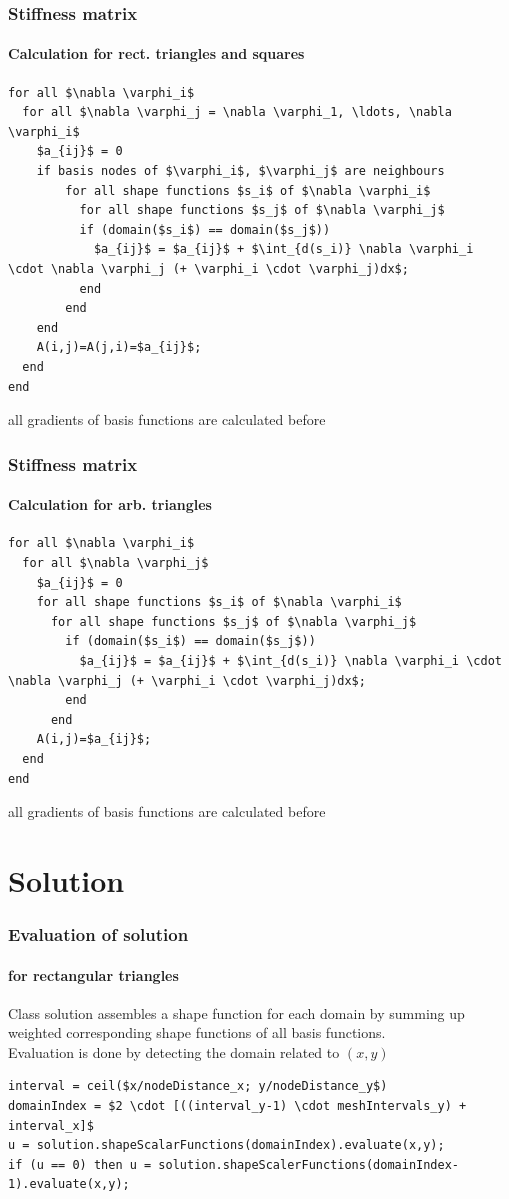 \documentclass[mathserif]{beamer}
\begin{document}
\begin{frame}[fragile]
\frametitle{Stiffness matrix}
\framesubtitle{Calculation for rect. triangles and squares}
\begin{lstlisting}[basicstyle=\tiny, mathescape]
for all $\nabla \varphi_i$
  for all $\nabla \varphi_j = \nabla \varphi_1, \ldots, \nabla \varphi_i$
    $a_{ij}$ = 0
    if basis nodes of $\varphi_i$, $\varphi_j$ are neighbours
		for all shape functions $s_i$ of $\nabla \varphi_i$
		  for all shape functions $s_j$ of $\nabla \varphi_j$
		  if (domain($s_i$) == domain($s_j$))
		    $a_{ij}$ = $a_{ij}$ + $\int_{d(s_i)} \nabla \varphi_i \cdot \nabla \varphi_j (+ \varphi_i \cdot \varphi_j)dx$;
		  end
		end
	end
    A(i,j)=A(j,i)=$a_{ij}$;
  end
end
\end{lstlisting}
all gradients of basis functions are calculated before
\end{frame}

\begin{frame}[fragile]
	\frametitle{Stiffness matrix}
	\framesubtitle{Calculation for arb. triangles}
	\begin{lstlisting}[basicstyle=\tiny, mathescape]
for all $\nabla \varphi_i$
  for all $\nabla \varphi_j$
    $a_{ij}$ = 0
	for all shape functions $s_i$ of $\nabla \varphi_i$
	  for all shape functions $s_j$ of $\nabla \varphi_j$
	    if (domain($s_i$) == domain($s_j$))
	      $a_{ij}$ = $a_{ij}$ + $\int_{d(s_i)} \nabla \varphi_i \cdot \nabla \varphi_j (+ \varphi_i \cdot \varphi_j)dx$;
	    end
	  end
	A(i,j)=$a_{ij}$;
  end
end
\end{lstlisting}
all gradients of basis functions are calculated before
\end{frame}

\section{Solution}

\begin{frame}[fragile]
	\frametitle{Evaluation of solution}
	\framesubtitle{for rectangular triangles}
	Class solution assembles a shape function for each domain by summing up weighted corresponding shape functions of all basis functions.\\
	Evaluation is done by detecting the domain related to $(x,y)$
\begin{lstlisting}[basicstyle=\tiny, mathescape]
interval = ceil($x/nodeDistance_x; y/nodeDistance_y$)
domainIndex = $2 \cdot [((interval_y-1) \cdot meshIntervals_y) + interval_x]$
u = solution.shapeScalarFunctions(domainIndex).evaluate(x,y);
if (u == 0) then u = solution.shapeScalerFunctions(domainIndex-1).evaluate(x,y);
\end{lstlisting}
\end{frame}
\end{document}
